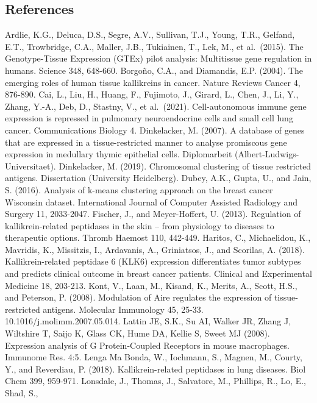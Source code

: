 \documentclass[
]{article}
\begin{document}
\hypertarget{references}{%
\subsection{References}\label{references}}

Ardlie, K.G., Deluca, D.S., Segre, A.V., Sullivan, T.J., Young, T.R.,
Gelfand, E.T., Trowbridge, C.A., Maller, J.B., Tukiainen, T., Lek, M.,
et al.~(2015). The Genotype-Tissue Expression (GTEx) pilot analysis:
Multitissue gene regulation in humans. Science 348, 648-660. Borgoño,
C.A., and Diamandis, E.P. (2004). The emerging roles of human tissue
kallikreins in cancer. Nature Reviews Cancer 4, 876-890. Cai, L., Liu,
H., Huang, F., Fujimoto, J., Girard, L., Chen, J., Li, Y., Zhang, Y.-A.,
Deb, D., Stastny, V., et al.~(2021). Cell-autonomous immune gene
expression is repressed in pulmonary neuroendocrine cells and small cell
lung cancer. Communications Biology 4. Dinkelacker, M. (2007). A
database of genes that are expressed in a tissue-restricted manner to
analyse promiscous gene expression in medullary thymic epithelial cells.
Diplomarbeit (Albert-Ludwigs-Universitaet). Dinkelacker, M. (2019).
Chromosomal clustering of tissue restricted antigens. Dissertation
(University Heidelberg). Dubey, A.K., Gupta, U., and Jain, S. (2016).
Analysis of k-means clustering approach on the breast cancer Wisconsin
dataset. International Journal of Computer Assisted Radiology and
Surgery 11, 2033-2047. Fischer, J., and Meyer-Hoffert, U. (2013).
Regulation of kallikrein-related peptidases in the skin -- from
physiology to diseases to therapeutic options. Thromb Haemost 110,
442-449. Haritos, C., Michaelidou, K., Mavridis, K., Missitzis, I.,
Ardavanis, A., Griniatsos, J., and Scorilas, A. (2018).
Kallikrein-related peptidase 6 (KLK6) expression differentiates tumor
subtypes and predicts clinical outcome in breast cancer patients.
Clinical and Experimental Medicine 18, 203-213. Kont, V., Laan, M.,
Kisand, K., Merits, A., Scott, H.S., and Peterson, P. (2008). Modulation
of Aire regulates the expression of tissue-restricted antigens.
Molecular Immunology 45, 25-33. 10.1016/j.molimm.2007.05.014. Lattin JE,
S.K., Su AI, Walker JR, Zhang J, Wiltshire T, Saijo K, Glass CK, Hume
DA, Kellie S, Sweet MJ (2008). Expression analysis of G Protein-Coupled
Receptors in mouse macrophages. Immunome Res. 4:5. Lenga Ma Bonda, W.,
Iochmann, S., Magnen, M., Courty, Y., and Reverdiau, P. (2018).
Kallikrein-related peptidases in lung diseases. Biol Chem 399, 959-971.
Lonsdale, J., Thomas, J., Salvatore, M., Phillips, R., Lo, E., Shad, S.,
\end{document}
